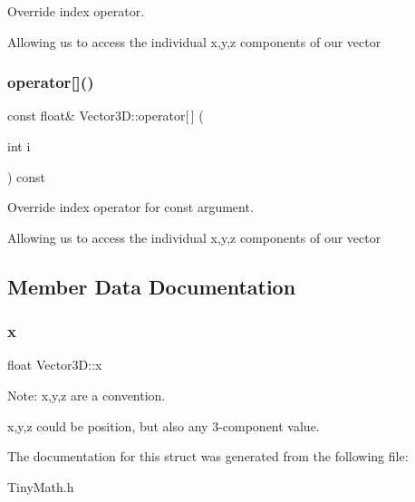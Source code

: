 Override index operator. 

Allowing us to access the individual x,y,z components of our vector \mbox{\label{struct_vector3_d_aeb8dfce8e40587899758e9f7d5752dc6}} 
\subsubsection{\texorpdfstring{operator[]()}{operator[]()}\hspace{0.1cm}{\footnotesize\ttfamily [2/2]}}
{\footnotesize\ttfamily const float\& Vector3\+D\+::operator\mbox{[}$\,$\mbox{]} (\begin{DoxyParamCaption}\item[{int}]{i }\end{DoxyParamCaption}) const\hspace{0.3cm}{\ttfamily [inline]}}



Override index operator for const argument. 

Allowing us to access the individual x,y,z components of our vector 

\subsection{Member Data Documentation}
\mbox{\label{struct_vector3_d_aca5d15bdb846448e3cb73b072783f329}} 
\subsubsection{\texorpdfstring{x}{x}}
{\footnotesize\ttfamily float Vector3\+D\+::x}



Note\+: x,y,z are a convention. 

x,y,z could be position, but also any 3-\/component value. 

The documentation for this struct was generated from the following file\+:\begin{DoxyCompactItemize}
\item 
Tiny\+Math.\+h\end{DoxyCompactItemize}
